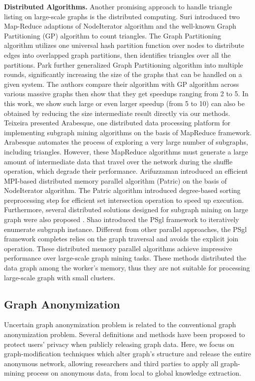 \textbf{Distributed Algorithms.} 
Another promising approach to handle triangle listing on large-scale graphs is the distributed computing. Suri {\etal} \cite{Suri_Vassilvitskii_2011} introduced two Map-Reduce adaptions of NodeIterator algorithm and the well-known Graph Partitioning (GP) algorithm to count triangles. The Graph Partitioning algorithm utilizes one universal hash partition function over nodes to distribute edges into overlapped graph partitions, then identifies triangles over all the partitions. Park {\etal} \cite{parkmapreduce2014} further generalized Graph Partitioning algorithm into multiple rounds, significantly increasing the size of the graphs that can be handled on a given system. The authors compare their algorithm with GP algorithm \cite{Suri_Vassilvitskii_2011} across various massive graphs then show that they get speedups ranging from 2 to 5. In this work, we show such large or even larger speedup (from 5 to 10) can also be obtained by reducing the size intermediate result directly via our methods. Teixeira {\etal} \cite{Teixeira_2015} presented Arabesque, one distributed data processing platform for implementing subgraph mining algorithms on the basis of MapReduce framework.  Arabesque automates the process of exploring a very large number of subgraphs, including triangles. However, these MapReduce algorithms must generate a large amount of intermediate data that travel over the network during the shuffle operation, which degrade their performance. Arifuzzaman {\etal} \cite{Patric} introduced an efficient MPI-based distributed memory parallel algorithm (Patric) on the basis of NodeIterator algorithm. The Patric algorithm introduced degree-based sorting preprocessing step for efficient set intersection operation to speed up execution. 
Furthermore, several distributed solutions designed for subgraph mining on large graph were also proposed \cite{Pregel,Shao_2014}. Shao {\etal} introduced the PSgl framework  to iteratively enumerate subgraph instance. Different from other parallel approaches, the PSgl framework completes relies on the graph traversal and avoids the explicit join operation. These distributed memory parallel algorithms achieve impressive performance over large-scale graph mining tasks. These methods distributed the data graph among the worker's memory, thus they are not suitable for processing large-scale graph with small clusters.

\subsection{Graph Anonymization}
Uncertain graph anonymization problem is related to the conventional graph anonymization problem. Several definitions and methods have been proposed to protect users' privacy when publicly releasing graph data. Here, we focus on graph-modification techniques which alter graph's structure and release the entire anonymous network, allowing researchers and third parties to apply all graph-mining process on anonymous data, from local to global knowledge extraction. 

